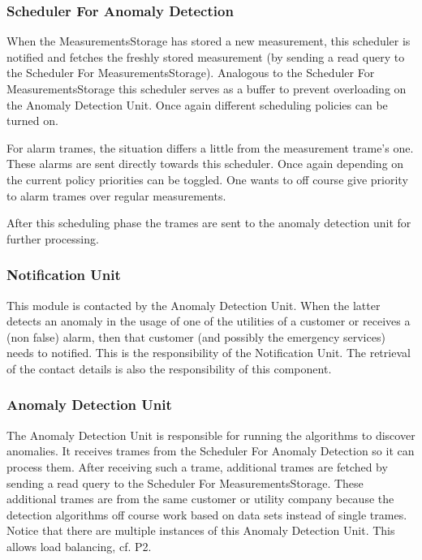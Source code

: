 \subsubsection{Scheduler For Anomaly Detection}

\npar When the MeasurementsStorage has stored a new measurement, this scheduler
is notified and fetches the freshly stored measurement (by sending a read query
to the Scheduler For MeasurementsStorage). Analogous to the Scheduler For
MeasurementsStorage this scheduler serves as a buffer to prevent overloading on
the Anomaly Detection Unit. Once again different scheduling policies can be
turned on.

\npar For alarm trames, the situation differs a little from the measurement
trame's one. These alarms are sent directly towards this scheduler. Once again
depending on the current policy priorities can be toggled. One wants to off
course give priority to alarm trames over regular measurements. 

\npar After this scheduling phase the trames are sent to the anomaly detection
unit for further processing.

\subsubsection{Notification Unit}

\npar This module is contacted by the Anomaly Detection Unit. When the latter
detects an anomaly in the usage of one of the utilities of a customer or
receives a (non false) alarm, then that customer (and possibly the emergency
services) needs to notified. This is the responsibility of the Notification
Unit. The retrieval of the contact details is also the responsibility of this
component.

\subsubsection{Anomaly Detection Unit}

\npar The Anomaly Detection Unit is responsible for running the algorithms to
discover anomalies. It receives trames from the Scheduler For Anomaly
Detection so it can process them. After receiving such a trame, additional
trames are fetched by sending a read query to the Scheduler For
MeasurementsStorage. These additional trames are from the same customer or
utility company because the detection algorithms off course work based on data
sets instead of single trames. Notice that there are multiple instances of this
Anomaly Detection Unit. This allows load balancing, cf. P2.

